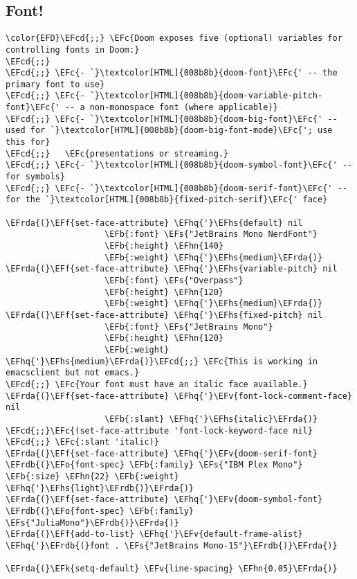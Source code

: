 \documentclass{article}
\newcommand{\EFc}[1]{\textcolor{EFc}{#1}} %
\newcommand{\EFcd}[1]{\textcolor{EFcd}{#1}} %
\newcommand{\EFs}[1]{\textcolor{EFs}{#1}} %
\newcommand{\EFk}[1]{\textcolor{EFk}{#1}} %
\newcommand{\EFb}[1]{\textcolor{EFb}{#1}} %
\newcommand{\EFf}[1]{\textcolor{EFf}{#1}} %
\newcommand{\EFv}[1]{\textcolor{EFv}{#1}} %
\newcommand{\EFo}[1]{\textcolor{EFo}{#1}} %
\newcommand{\EFhn}[1]{\textcolor{EFhn}{\textbf{#1}}} %
\newcommand{\EFhq}[1]{#1} %
\newcommand{\EFhs}[1]{\textcolor{EFhs}{#1}} %
\newcommand{\EFrda}[1]{\textcolor{EFrda}{#1}} %
\newcommand{\EFrdb}[1]{\textcolor{EFrdb}{#1}} %
\begin{document}
\subsection{Font!}
\label{sec:orgc7b81bd}
\begin{Code}
\begin{Verbatim}
\color{EFD}\EFcd{;;} \EFc{Doom exposes five (optional) variables for controlling fonts in Doom:}
\EFcd{;;}
\EFcd{;;} \EFc{- `}\textcolor[HTML]{008b8b}{doom-font}\EFc{' -- the primary font to use}
\EFcd{;;} \EFc{- `}\textcolor[HTML]{008b8b}{doom-variable-pitch-font}\EFc{' -- a non-monospace font (where applicable)}
\EFcd{;;} \EFc{- `}\textcolor[HTML]{008b8b}{doom-big-font}\EFc{' -- used for `}\textcolor[HTML]{008b8b}{doom-big-font-mode}\EFc{'; use this for}
\EFcd{;;}   \EFc{presentations or streaming.}
\EFcd{;;} \EFc{- `}\textcolor[HTML]{008b8b}{doom-symbol-font}\EFc{' -- for symbols}
\EFcd{;;} \EFc{- `}\textcolor[HTML]{008b8b}{doom-serif-font}\EFc{' -- for the `}\textcolor[HTML]{008b8b}{fixed-pitch-serif}\EFc{' face}

\EFrda{(}\EFf{set-face-attribute} \EFhq{'}\EFhs{default} nil
                    \EFb{:font} \EFs{"JetBrains Mono NerdFont"}
                    \EFb{:height} \EFhn{140}
                    \EFb{:weight} \EFhq{'}\EFhs{medium}\EFrda{)}
\EFrda{(}\EFf{set-face-attribute} \EFhq{'}\EFhs{variable-pitch} nil
                    \EFb{:font} \EFs{"Overpass"}
                    \EFb{:height} \EFhn{120}
                    \EFb{:weight} \EFhq{'}\EFhs{medium}\EFrda{)}
\EFrda{(}\EFf{set-face-attribute} \EFhq{'}\EFhs{fixed-pitch} nil
                    \EFb{:font} \EFs{"JetBrains Mono"}
                    \EFb{:height} \EFhn{120}
                    \EFb{:weight} \EFhq{'}\EFhs{medium}\EFrda{)}\EFcd{;;} \EFc{This is working in emacsclient but not emacs.}
\EFcd{;;} \EFc{Your font must have an italic face available.}
\EFrda{(}\EFf{set-face-attribute} \EFhq{'}\EFv{font-lock-comment-face} nil
                    \EFb{:slant} \EFhq{'}\EFhs{italic}\EFrda{)}
\EFcd{;;}\EFc{(set-face-attribute 'font-lock-keyword-face nil}
\EFcd{;;} \EFc{:slant 'italic)}
\EFrda{(}\EFf{set-face-attribute} \EFhq{'}\EFv{doom-serif-font} \EFrdb{(}\EFo{font-spec} \EFb{:family} \EFs{"IBM Plex Mono"} \EFb{:size} \EFhn{22} \EFb{:weight} \EFhq{'}\EFhs{light}\EFrdb{)}\EFrda{)}
\EFrda{(}\EFf{set-face-attribute} \EFhq{'}\EFv{doom-symbol-font} \EFrdb{(}\EFo{font-spec} \EFb{:family} \EFs{"JuliaMono"}\EFrdb{)}\EFrda{)}
\EFrda{(}\EFf{add-to-list} \EFhq{'}\EFv{default-frame-alist} \EFhq{'}\EFrdb{(}font . \EFs{"JetBrains Mono-15"}\EFrdb{)}\EFrda{)}

\EFrda{(}\EFk{setq-default} \EFv{line-spacing} \EFhn{0.05}\EFrda{)}
\end{Verbatim}
\end{Code}
\end{document}
